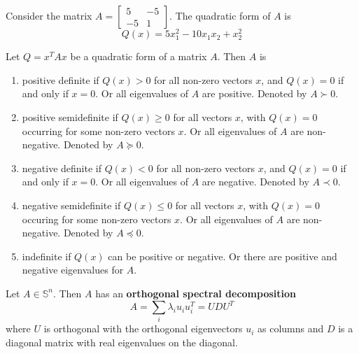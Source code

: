 \begin{problem}[Example]
  Consider the matrix $A = \begin{bmatrix}
      5 & -5 \\
      -5 & 1
  \end{bmatrix}$. The quadratic form of $A$ is $$Q(x) = 5x^2_1 - 10x_1x_2 + x^2_2$$
\end{problem}
\begin{definition}
  Let $Q = x^TAx$ be a quadratic form of a matrix $A$. Then $A$ is
  \begin{enumerate}
      \item positive definite if $Q(x) > 0$ for all non-zero vectors $x$, and $Q(x) = 0$ if and only if $x = 0$. Or all eigenvalues of $A$ are positive. Denoted by $A \succ 0$.
      \item positive semidefinite if $Q(x) \geq 0$ for all vectors $x$, with $Q(x) = 0$ occurring for some non-zero vectors $x$. Or all eigenvalues of $A$ are non-negative. Denoted by $A \succeq 0$.
      \item negative definite if $Q(x) < 0$ for all non-zero vectors $x$, and $Q(x) = 0$ if and only if $x = 0$. Or all eigenvalues of $A$ are negative. Denoted by $A \prec 0$.
      \item negative semidefinite if $Q(x) \leq 0$ for all vectors $x$, with $Q(x) = 0$ occuring for some non-zero vectors $x$. Or all eigenvalues of $A$ are non-negative. Denoted by $A \preceq 0$.
      \item indefinite if $Q(x)$ can be positive or negative. Or there are positive and negative eigenvalues for $A$.
  \end{enumerate}
\end{definition}
\begin{theorem}
  Let $A \in \mathbb S^n$. Then $A$ has an \textbf{orthogonal spectral decomposition}
  $$A = \sum_i \lambda_i u_i u_i^T = UDU^T$$ where $U$ is orthogonal with the orthogonal eigenvectors $u_i$ as columns and $D$ is a diagonal matrix with real eigenvalues on the diagonal.
\end{theorem}
